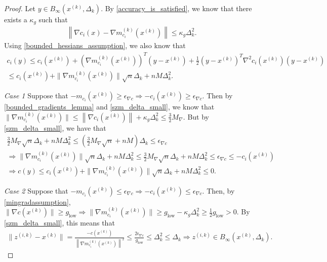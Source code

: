 \documentclass{article}
\theoremstyle{case}
\newcommand{\maxgrad}{{M_{\nabla}}}
\newcommand{\xk}{{x^{(k)}}}
\newcommand{\dk}{\Delta_k}
\newcommand{\zik}{{z^{(i, k)}}}
\newcommand{\gmcik}{{\nabla m_{c_i}^{(k)}(\xk)}}
\newcommand{\tr}{{ B_{\infty}\left(\xk, \dk\right) }}
\newcommand{\mingradepsilon}{{\epsilon_{\nabla c}}}
\newcommand{\mingrad}{{ g_{\text{low}} }}
\begin{document}
\begin{proof}
Let $y\in \tr$.
By \cref{accuracy_is_satisfied}, we know that there exists a $\kappa_g$ such that
\begin{align*}
\left\|\nabla c_i(x) - \gmcik\right\| \le \kappa_g \dk^2.
\end{align*}
Using \cref{bounded_hessians_assumption}, we also know that
\begin{align*}
c_i(y) \le c_i(\xk) + \left(\gmcik\right)^T(y - \xk) + \frac 1 2 \left(y - \xk\right)^T\nabla^2{c_i}(\xk)\left(y - \xk\right) \\
\le c_i(\xk) + \|\gmcik\|\sqrt{n}\dk +nM\dk^2.
\end{align*}

\emph{Case 1}
Suppose that $-m_{c_i}(\xk) \ge \mingradepsilon \Longrightarrow -c_i(\xk) \ge \mingradepsilon$.
Then  by \cref{bounded_gradients_lemma} and \cref{szm_delta_small}, we know that 
$\| \gmcik \| \le \left\|\nabla c_i(\xk)\right\| + \kappa_g \dk^2 \le \frac 3 2 \maxgrad$.
But by \cref{szm_delta_small}, we have that
\begin{align*}
\frac 3 2 \maxgrad\sqrt{n}\dk + nM\dk^2 \le \left(\frac 3 2 \maxgrad\sqrt{n} + nM\right)\dk \le \mingradepsilon \\
\Longrightarrow \|\gmcik\|\sqrt{n}\dk + nM\dk^2 \le \frac 3 2 \maxgrad\sqrt{n}\dk + nM\dk^2 \le \mingradepsilon \le -c_i(\xk)\\
\Longrightarrow c(y) \le c_i(\xk) + \|\gmcik\|\sqrt{n}\dk + nM\dk^2 \le 0.
\end{align*}

\emph{Case 2}
Suppose that $-m_{c_i}(\xk) \le \mingradepsilon \Longrightarrow -c_i(\xk) \le \mingradepsilon$.
Then, by \cref{mingradassumption}, $\|\nabla c(\xk) \| \ge \mingrad \Longrightarrow \|\gmcik\| \ge \mingrad - \kappa_g \dk^2 \ge \frac 1 2 \mingrad > 0$.
By \cref{szm_delta_small}, this means that 
\begin{align*}
\|\zik-\xk\| = \frac{-c(\xk)}{\left\|\gmcik\right\|^2} \le \frac{2\mingradepsilon}{\mingrad}\le \dk^2 \le \dk \Longrightarrow \zik \in \tr.
\end{align*}
\end{proof}
\end{document}
